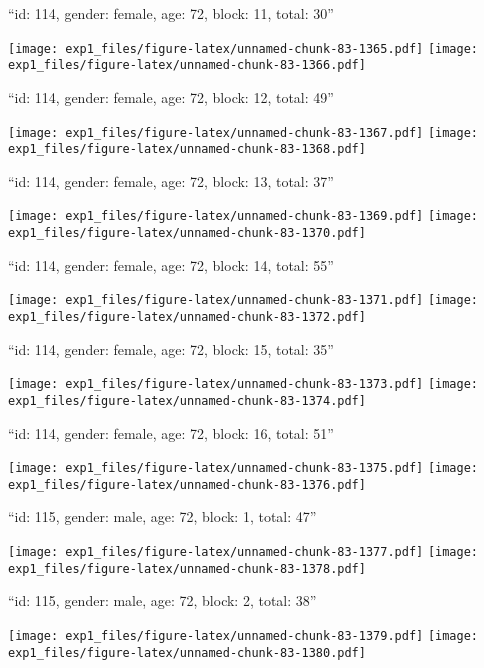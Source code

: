 \documentclass[11pt,,]{article}
\begin{document}
\newpage
[1] 

``id: 114, gender: female, age: 72, block: 11, total: 30''

\texttt{[image: exp1\_files/figure-latex/unnamed-chunk-83-1365.pdf]}
\texttt{[image: exp1\_files/figure-latex/unnamed-chunk-83-1366.pdf]}

\newpage
[1] 

``id: 114, gender: female, age: 72, block: 12, total: 49''

\texttt{[image: exp1\_files/figure-latex/unnamed-chunk-83-1367.pdf]}
\texttt{[image: exp1\_files/figure-latex/unnamed-chunk-83-1368.pdf]}

\newpage
[1] 

``id: 114, gender: female, age: 72, block: 13, total: 37''

\texttt{[image: exp1\_files/figure-latex/unnamed-chunk-83-1369.pdf]}
\texttt{[image: exp1\_files/figure-latex/unnamed-chunk-83-1370.pdf]}

\newpage
[1] 

``id: 114, gender: female, age: 72, block: 14, total: 55''

\texttt{[image: exp1\_files/figure-latex/unnamed-chunk-83-1371.pdf]}
\texttt{[image: exp1\_files/figure-latex/unnamed-chunk-83-1372.pdf]}

\newpage
[1] 

``id: 114, gender: female, age: 72, block: 15, total: 35''

\texttt{[image: exp1\_files/figure-latex/unnamed-chunk-83-1373.pdf]}
\texttt{[image: exp1\_files/figure-latex/unnamed-chunk-83-1374.pdf]}

\newpage
[1] 

``id: 114, gender: female, age: 72, block: 16, total: 51''

\texttt{[image: exp1\_files/figure-latex/unnamed-chunk-83-1375.pdf]}
\texttt{[image: exp1\_files/figure-latex/unnamed-chunk-83-1376.pdf]}

\newpage
[1] 

``id: 115, gender: male, age: 72, block: 1, total: 47''

\texttt{[image: exp1\_files/figure-latex/unnamed-chunk-83-1377.pdf]}
\texttt{[image: exp1\_files/figure-latex/unnamed-chunk-83-1378.pdf]}

\newpage
[1] 

``id: 115, gender: male, age: 72, block: 2, total: 38''

\texttt{[image: exp1\_files/figure-latex/unnamed-chunk-83-1379.pdf]}
\texttt{[image: exp1\_files/figure-latex/unnamed-chunk-83-1380.pdf]}
\end{document}
